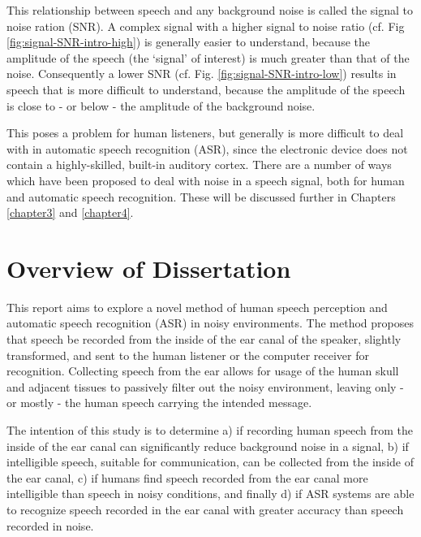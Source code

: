 This relationship between speech and any background noise is called the signal to noise ration (SNR).  A complex signal with a higher signal to noise ratio (cf. Fig \ref{fig:signal-SNR-intro-high}) is generally easier to understand, because the amplitude of the speech (the `signal' of interest) is much greater than that of the noise.  Consequently a lower SNR (cf. Fig. \ref{fig:signal-SNR-intro-low}) results in speech that is more difficult to understand, because the amplitude of the speech is close to - or below - the amplitude of the background noise.

This poses a problem for human listeners, but generally is more difficult to deal with in automatic speech recognition (ASR), since the electronic device does not contain a highly-skilled, built-in auditory cortex.  There are a number of ways which have been proposed to deal with noise in a speech signal, both for human and automatic speech recognition.  These will be discussed further in Chapters \ref{chapter3} and \ref{chapter4}.

\section{Overview of Dissertation}\label{ch1:diss-overview}

This report aims to explore a novel method of human speech perception and automatic speech recognition (ASR) in noisy environments.  The method proposes that speech be recorded from the inside of the ear canal of the speaker, slightly transformed, and sent to the human listener or the computer receiver for recognition.  Collecting speech from the ear allows for usage of the human skull and adjacent tissues to passively filter out the noisy environment, leaving only - or mostly - the human speech carrying the intended message.  
	
The intention of this study is to determine a) if recording human speech from the inside of the ear canal can significantly reduce background noise in a signal, b) if intelligible speech, suitable for communication, can be collected from the inside of the ear canal, c) if humans find speech recorded from the ear canal more intelligible than speech in noisy conditions, and finally d) if ASR systems are able to recognize speech recorded in the ear canal with greater accuracy than speech recorded in noise.
	
